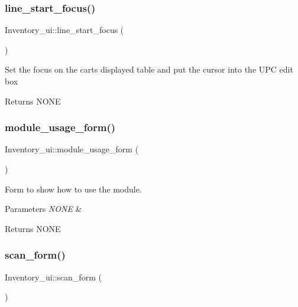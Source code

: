 \subsubsection{\texorpdfstring{line\+\_\+start\+\_\+focus()}{line\_start\_focus()}}
{\footnotesize\ttfamily Inventory\+\_\+ui\+::line\+\_\+start\+\_\+focus (\begin{DoxyParamCaption}{ }\end{DoxyParamCaption})}

Set the focus on the cart\textquotesingle{}s displayed table and put the cursor into the U\+PC edit box

\begin{DoxyReturn}{Returns}
N\+O\+NE 
\end{DoxyReturn}
\hypertarget{class_inventory__ui_af471f1ac90fef82d9f75185c7c8377f2}{}\label{class_inventory__ui_af471f1ac90fef82d9f75185c7c8377f2} 
\subsubsection{\texorpdfstring{module\+\_\+usage\+\_\+form()}{module\_usage\_form()}}
{\footnotesize\ttfamily Inventory\+\_\+ui\+::module\+\_\+usage\+\_\+form (\begin{DoxyParamCaption}{ }\end{DoxyParamCaption})}

Form to show how to use the module.


\begin{DoxyParams}{Parameters}
{\em N\+O\+NE} & \\
\hline
\end{DoxyParams}
\begin{DoxyReturn}{Returns}
N\+O\+NE 
\end{DoxyReturn}
\hypertarget{class_inventory__ui_a208526e58fa535e58764a7364316b4ae}{}\label{class_inventory__ui_a208526e58fa535e58764a7364316b4ae} 
\subsubsection{\texorpdfstring{scan\+\_\+form()}{scan\_form()}}
{\footnotesize\ttfamily Inventory\+\_\+ui\+::scan\+\_\+form (\begin{DoxyParamCaption}{ }\end{DoxyParamCaption})}

